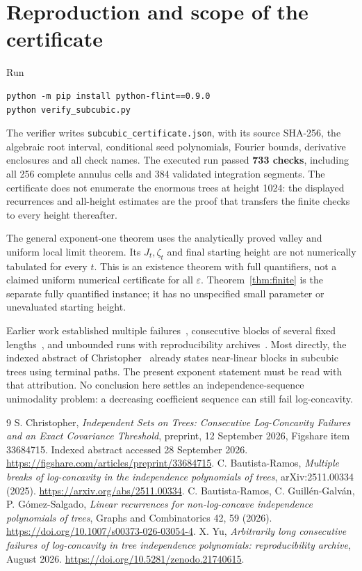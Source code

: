 \documentclass[11pt]{article}
\begin{document}
\section{Reproduction and scope of the certificate}
Run
\begin{verbatim}
python -m pip install python-flint==0.9.0
python verify_subcubic.py
\end{verbatim}
The verifier writes \texttt{subcubic\_certificate.json}, with its source
SHA-256, the algebraic root interval, conditional seed polynomials,
Fourier bounds, derivative enclosures and all check names.
The executed run passed \textbf{733 checks}, including all 256 complete
annulus cells and 384 validated integration segments.
The certificate does not enumerate the enormous trees at height 1024:
the displayed recurrences and all-height estimates are the proof that
transfers the finite checks to every height thereafter.

The general exponent-one theorem uses the analytically proved valley
and uniform local limit theorem. Its $J_t,\zeta_t$ and final starting
height are not numerically tabulated for every $t$. This is an
existence theorem with full quantifiers, not a claimed uniform numerical
certificate for all $\varepsilon$. Theorem~\ref{thm:finite} is the separate
fully quantified instance; it has no unspecified small parameter or
unevaluated starting height.

Earlier work established multiple failures~\cite{BR}, consecutive
blocks of several fixed lengths~\cite{BRGG}, and unbounded runs with
reproducibility archives~\cite{Yu}. Most directly, the indexed abstract
of Christopher~\cite{Christopher} already states near-linear blocks in
subcubic trees using terminal paths. The present exponent statement
must be read with that attribution. No conclusion here settles an
independence-sequence unimodality problem: a decreasing coefficient
sequence can still fail log-concavity.

\begin{thebibliography}{9}
 S. Christopher,
\emph{Independent Sets on Trees: Consecutive Log-Concavity Failures and
an Exact Covariance Threshold}, preprint, 12 September 2026,
Figshare item 33684715. Indexed abstract accessed 28 September 2026.
\url{https://figshare.com/articles/preprint/33684715}.
 C. Bautista-Ramos,
\emph{Multiple breaks of log-concavity in the independence polynomials
of trees}, arXiv:2511.00334 (2025).
\url{https://arxiv.org/abs/2511.00334}.
 C. Bautista-Ramos, C. Guill\'en-Galv\'an,
P. G\'omez-Salgado,
\emph{Linear recurrences for non-log-concave independence polynomials
of trees}, Graphs and Combinatorics 42, 59 (2026).
\url{https://doi.org/10.1007/s00373-026-03054-4}.
 X. Yu,
\emph{Arbitrarily long consecutive failures of log-concavity in tree
independence polynomials: reproducibility archive}, August 2026.
\url{https://doi.org/10.5281/zenodo.21740615}.
\end{thebibliography}
\end{document}

